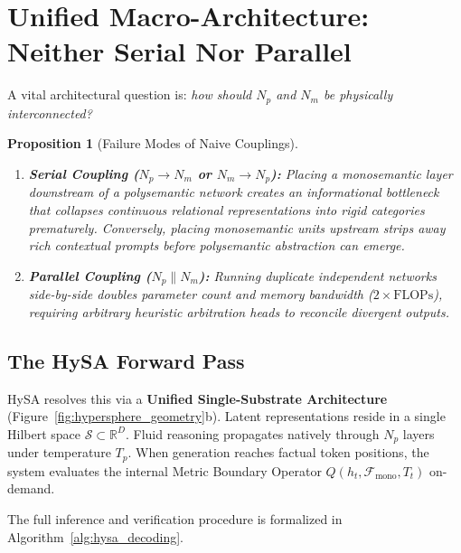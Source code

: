 \documentclass[10pt,twocolumn]{article}
\newtheorem{proposition}{Proposition}
\theoremstyle{definition}
\begin{document}
\section{Unified Macro-Architecture: Neither Serial Nor Parallel}

A vital architectural question is: \textit{how should $N_p$ and $N_m$ be physically interconnected?}

\begin{proposition}[Failure Modes of Naive Couplings]
\leavevmode
\begin{enumerate}[leftmargin=*, itemsep=2.0pt]
    \item \textbf{Serial Coupling ($N_p \to N_m$ or $N_m \to N_p$):} Placing a monosemantic layer downstream of a polysemantic network creates an informational bottleneck that collapses continuous relational representations into rigid categories prematurely. Conversely, placing monosemantic units upstream strips away rich contextual prompts before polysemantic abstraction can emerge.
    \item \textbf{Parallel Coupling ($N_p \parallel N_m$):} Running duplicate independent networks side-by-side doubles parameter count and memory bandwidth ($2\times \mathrm{FLOPs}$), requiring arbitrary heuristic arbitration heads to reconcile divergent outputs.
\end{enumerate}
\end{proposition}

\subsection{The HySA Forward Pass}
HySA resolves this via a \textbf{Unified Single-Substrate Architecture} (Figure~\ref{fig:hypersphere_geometry}b). Latent representations reside in a single Hilbert space $\mathcal{S} \subset \mathbb{R}^D$. Fluid reasoning propagates natively through $N_p$ layers under temperature $T_p$. When generation reaches factual token positions, the system evaluates the internal Metric Boundary Operator $Q(h_t, \mathcal{F}_{\mathrm{mono}}, T_t)$ on-demand.

The full inference and verification procedure is formalized in Algorithm~\ref{alg:hysa_decoding}.
\end{document}
